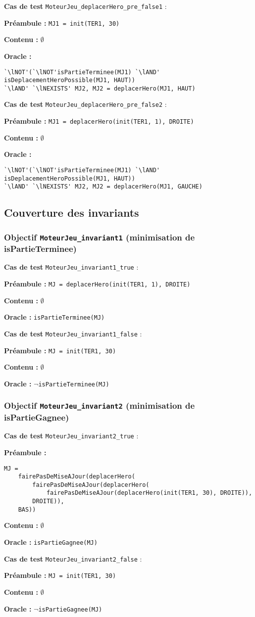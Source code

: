 \documentclass{article}
\newcommand{\cmd}[1]{\texttt{#1}}
\newcommand{\lAND}{$\land$}
\newcommand{\lNOT}{$\lnot$}
\newcommand{\lNEXISTS}{$\nexists{}$}
\newcommand{\obj}[2]{\subsubsection*{\large{\textbf{Objectif {\cmd{#1} (#2)}}}}}
\newenvironment{cas}[1]
{
	\hspace{1em}\textbf{Cas de test} \cmd{#1} :
	\begin{list}{}{}
}{
	\end{list}\vspace{1em}
}
\newcommand{\pre}[1]{\item \textbf{Préambule :} \cmd{#1}}
\newcommand{\nope}{\item \textbf{Contenu :} $\emptyset$}
\newcommand{\ora}[1]{\item \textbf{Oracle :} \cmd{#1}}
\newcommand{\oram}{\item \textbf{Oracle :}}
\newcommand{\prem}{\item \textbf{Préambule :}}
\begin{document}
	\begin{cas} {MoteurJeu\_deplacerHero\_pre\_false1}
		\pre{MJ1 = init(TER1, 30)}
		\nope{}
		\oram{}
		\begin{lstlisting}
`\lNOT'(`\lNOT'isPartieTerminee(MJ1) `\lAND' isDeplacementHeroPossible(MJ1, HAUT))
`\lAND' `\lNEXISTS' MJ2, MJ2 = deplacerHero(MJ1, HAUT)
		\end{lstlisting}
	\end{cas}

	\begin{cas} {MoteurJeu\_deplacerHero\_pre\_false2}
		\pre{MJ1 = deplacerHero(init(TER1, 1), DROITE)}
		\nope{}
		\oram{}
		\begin{lstlisting}
`\lNOT'(`\lNOT'isPartieTerminee(MJ1) `\lAND' isDeplacementHeroPossible(MJ1, HAUT))
`\lAND' `\lNEXISTS' MJ2, MJ2 = deplacerHero(MJ1, GAUCHE)
		\end{lstlisting}
	\end{cas}


\subsection*{Couverture des invariants}

\obj{MoteurJeu\_invariant1} {minimisation de isPartieTerminee}
	\begin{cas} {MoteurJeu\_invariant1\_true}
		\pre{MJ = deplacerHero(init(TER1, 1), DROITE)}
		\nope{}
		\ora{isPartieTerminee(MJ)}
	\end{cas}

	\begin{cas} {MoteurJeu\_invariant1\_false}
		\pre{MJ = init(TER1, 30)}
		\nope{}
		\ora{\lNOT{}isPartieTerminee(MJ)}
	\end{cas}

\obj{MoteurJeu\_invariant2} {minimisation de isPartieGagnee}
	\begin{cas} {MoteurJeu\_invariant2\_true}
		\prem{}
		\begin{lstlisting}
MJ =
	fairePasDeMiseAJour(deplacerHero(
		fairePasDeMiseAJour(deplacerHero(
			fairePasDeMiseAJour(deplacerHero(init(TER1, 30), DROITE)),
		DROITE)),
	BAS))
		\end{lstlisting}
		\nope{}
		\ora{isPartieGagnee(MJ)}
	\end{cas}

	\begin{cas} {MoteurJeu\_invariant2\_false}
		\pre{MJ = init(TER1, 30)}
		\nope{}
		\ora{\lNOT{}isPartieGagnee(MJ)}
	\end{cas}
\end{document}
